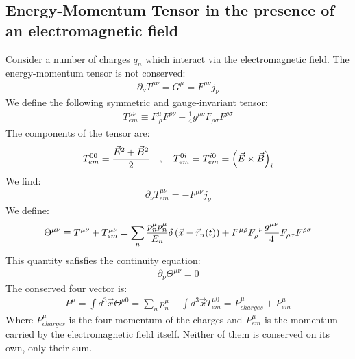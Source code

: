 \subsection{Energy-Momentum Tensor in the presence of an electromagnetic field}

Consider a number of charges $q_n$ which interact via the electromagnetic field.
The energy-momentum tensor is not conserved:
\begin{align*}
    \partial_\nu T^{\mu \nu} = G^{\mu} = F^{\mu \nu} j_{\nu}
\end{align*}
We define the following symmetric and gauge-invariant tensor:
\begin{align*}
    T_{em}^{\mu \nu} \equiv
    F_{\ \rho}^{\mu} F^{\rho \nu} + \frac{1}{4} g^{\mu \nu} F_{\rho \sigma} F^{\rho \sigma}
\end{align*}
The components of the tensor are:
\begin{align*}
    T_{em}^{00} = \frac{\vec{E}^2 + \vec{B}^2}{2}
    \hspace{10pt} , \hspace{10pt}
    T_{em}^{0i} = T_{em}^{i0} = \left( \vec{E} \times \vec{B} \right)_i
\end{align*}
We find:
\begin{align*}
    \partial_\nu T_{em}^{\mu \nu} = - F^{\mu \nu} j_\nu
\end{align*}
We define:
\begin{align*}
    \Theta^{\mu \nu} \equiv T^{\mu \nu} + T^{\mu \nu}_{em}
    = \sum_n \frac{p_n^\mu p_n^\mu}{E_n} \delta \left( \vec{x} - \vec{r}_n (t) \right)
        + F^{\mu \rho} F_\rho^{\ \nu} \frac{g^{\mu \nu}}{4} F_{\rho \sigma} F^{\rho \sigma}
\end{align*}
This quantity safisfies the continuity equation:
\begin{align*}
    \partial_{\nu} \Theta^{\mu \nu} = 0
\end{align*}
The conserved four vector is:
\begin{align*}
    P^\mu =
    \int d^3 \vec{x} \Theta^{\mu 0} = \sum_n p_n^\mu + \int d^3 \vec{x} T_{em}^{\mu 0}
    = P_{charges}^\mu + P_{em}^\mu
\end{align*}
Where $P_{charges}^\mu$ is the four-momentum of the charges and $P_{em}^\mu$
is the momentum carried by the electromagnetic field itself. Neither of them
is conserved on its own, only their sum.

\vspace{1\baselineskip}

